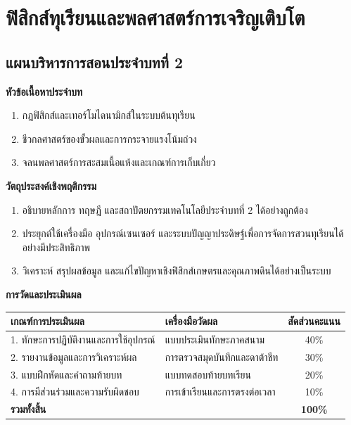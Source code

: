 \chapter{ฟิสิกส์ทุเรียนและพลศาสตร์การเจริญเติบโต}
\label{chap:ch02}

\section*{แผนบริหารการสอนประจำบทที่ 2}

\noindent\textbf{หัวข้อเนื้อหาประจำบท}
\begin{enumerate}
    \item กฎฟิสิกส์และเทอร์โมไดนามิกส์ในระบบต้นทุเรียน
    \item ชีวกลศาสตร์ของขั้วผลและการกระจายแรงโน้มถ่วง
    \item จลนพลศาสตร์การสะสมเนื้อแห้งและเกณฑ์การเก็บเกี่ยว
\end{enumerate}

\noindent\textbf{วัตถุประสงค์เชิงพฤติกรรม}
\begin{enumerate}
    \item อธิบายหลักการ ทฤษฎี และสถาปัตยกรรมเทคโนโลยีประจำบทที่ 2 ได้อย่างถูกต้อง
    \item ประยุกต์ใช้เครื่องมือ อุปกรณ์เซนเซอร์ และระบบปัญญาประดิษฐ์เพื่อการจัดการสวนทุเรียนได้อย่างมีประสิทธิภาพ
    \item วิเคราะห์ สรุปผลข้อมูล และแก้ไขปัญหาเชิงฟิสิกส์เกษตรและคุณภาพดินได้อย่างเป็นระบบ
\end{enumerate}

\noindent\textbf{การวัดและประเมินผล}
\begin{table}[H]
\centering\small
\begin{tabularx}{\textwidth}{p{} p{} c}
\toprule
\textbf{เกณฑ์การประเมินผล} & \textbf{เครื่องมือวัดผล} & \textbf{สัดส่วนคะแนน} \\
\midrule
1. ทักษะการปฏิบัติงานและการใช้อุปกรณ์ & แบบประเมินทักษะภาคสนาม & 40\% \\
2. รายงานข้อมูลและการวิเคราะห์ผล & การตรวจสมุดบันทึกและดาต้าชีท & 30\% \\
3. แบบฝึกหัดและคำถามท้ายบท & แบบทดสอบท้ายบทเรียน & 20\% \\
4. การมีส่วนร่วมและความรับผิดชอบ & การเข้าเรียนและการตรงต่อเวลา & 10\% \\
\midrule
\textbf{รวมทั้งสิ้น} & & \textbf{100\%} \\
\bottomrule
\end{tabularx}
\end{table}
\newpage

